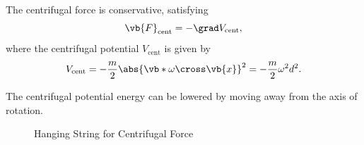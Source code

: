 \begin{proposition}
    \label{prop:centrifugal-potential}%
    The centrifugal force is conservative, satisfying
    \begin{equation}
        \vb{F}_{\text{cent}} = - \grad V_{\text{cent}},
    \end{equation}
    where the centrifugal potential \(V_{\text{cent}}\) is given by
    \begin{equation}
        V_{\text{cent}} = - \frac{m}{2} \abs{\vb*{\omega} \cross \vb{x}}^2 = - \frac{m}{2} \omega^2 d^2.
    \end{equation}
\end{proposition}

The centrifugal potential energy can be lowered by moving away from the axis of rotation.

\begin{figure}[ht!]
    \centering

    \caption{Hanging String for Centrifugal Force}
    \label{fig:hanging-string-centrifugal}%
\end{figure}

